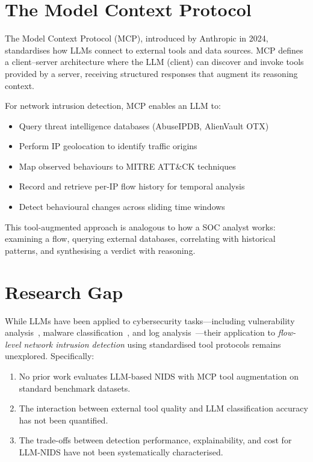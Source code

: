 \documentclass[12pt, a4paper, oneside]{report}
\begin{document}
\section{The Model Context Protocol}
\label{sec:mcp-intro}

The Model Context Protocol (MCP), introduced by Anthropic in 2024, standardises
how LLMs connect to external tools and data sources. MCP defines a client--server
architecture where the LLM (client) can discover and invoke tools provided by a
server, receiving structured responses that augment its reasoning context.

For network intrusion detection, MCP enables an LLM to:
\begin{itemize}
  \item Query threat intelligence databases (AbuseIPDB, AlienVault OTX)
  \item Perform IP geolocation to identify traffic origins
  \item Map observed behaviours to MITRE ATT\&CK techniques
  \item Record and retrieve per-IP flow history for temporal analysis
  \item Detect behavioural changes across sliding time windows
\end{itemize}

This tool-augmented approach is analogous to how a SOC analyst works: examining
a flow, querying external databases, correlating with historical patterns, and
synthesising a verdict with reasoning.

\section{Research Gap}
\label{sec:research-gap}

While LLMs have been applied to cybersecurity tasks---including vulnerability
analysis~\cite{zhang2024survey}, malware classification~\cite{ferrag2024generative}, and log
analysis~\cite{auditllm2024}---their application to \emph{flow-level network intrusion
detection} using standardised tool protocols remains unexplored. Specifically:

\begin{enumerate}
  \item No prior work evaluates LLM-based NIDS with MCP tool augmentation on
        standard benchmark datasets.
  \item The interaction between external tool quality and LLM classification
        accuracy has not been quantified.
  \item The trade-offs between detection performance, explainability, and
        cost for LLM-NIDS have not been systematically characterised.
\end{enumerate}
\end{document}
